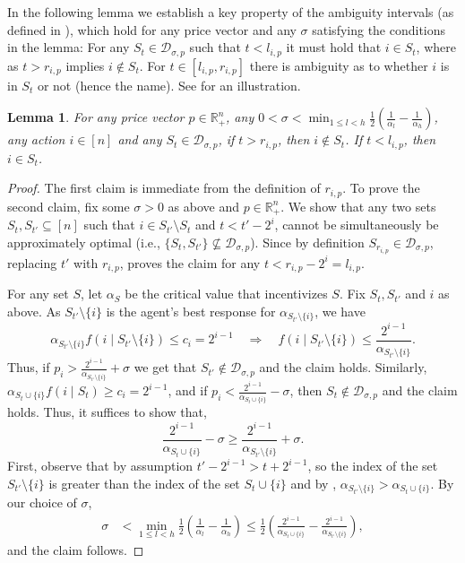 \documentclass[11pt]{article}
\newtheorem{lemma}{Lemma}
\newcommand{\reals}{\mathbb{R}}
\newcommand{\demand}[2]{\mathcal{D}_{{#1},{#2}}}
\newcommand{\demSigP}{\demand{\sigma}{p}}
\begin{document}
In the following lemma we establish a key property of the ambiguity intervals (as defined in ), which hold for any price vector and any $\sigma$ satisfying the conditions in the lemma: For any $S_t \in \demSigP$ such that $t < l_{i,p}$ it must hold that $i \in S_t$, where as $t > r_{i,p}$ implies $i \notin S_t$. For $t \in [l_{i,p}, r_{i,p}]$ there is ambiguity as to whether $i$ is in $S_t$ or not (hence the name). See  for an illustration.
 
\begin{lemma}\label{lem:RLintervals}
    For any price vector $p \in \reals_{+}^n$, any $0 < \sigma < \min_{1 \le l < h}\frac{1}{2}\left(\frac{1}{\alpha_l} - \frac{1}{\alpha_h}\right)$, any action $i \in [n]$ and any $S_t \in \demSigP$, if $t > r_{i,p}$, then $i \notin S_t$. If $t < l_{i,p}$, then $i \in S_t$.
\end{lemma}
\begin{proof}
    The first claim is immediate from the definition of $r_{i,p}$.
    To prove the second claim, fix some $\sigma > 0$ as above and $p \in \reals_{+}^n$. We show that any two sets $S_t,S_{t'} \subseteq [n]$ such that $i \in S_{t'}\setminus S_t$ and $t < t' - 2^i$, cannot be simultaneously be approximately optimal (i.e., $\{S_t,S_{t'}\} \not\subseteq \demSigP$).
    Since by definition $S_{r_{i,p}} \in \demSigP$, replacing $t'$ with $r_{i,p}$, proves the claim for any $t < r_{i,p} - 2^i = l_{i,p}$.

    For any set $S$, let $\alpha_S$ be the critical value that incentivizes $S$.
    Fix $S_t, S_{t'}$ and $i$ as above. 
    As $S_{t'} \setminus \{i\}$ is the agent's best response for $\alpha_{S_{t'}\setminus \{i\}}$, we have
    $$
    \alpha_{S_{t'}\setminus\{i\}}f(i \mid S_{t'}\setminus\{i\}) \le c_i = 2^{i-1}
    \quad
    \Longrightarrow
    \quad
    f(i \mid S_{t'}\setminus\{i\}) \le \frac{2^{i-1}}{\alpha_{S_{t'}\setminus\{i\}}}.
    $$
    Thus, if $p_i > \frac{2^{i-1}}{\alpha_{S_{t'}\setminus\{i\}}}  + \sigma$ we get that $S_{t'} \notin \demSigP$ and the claim holds.
    Similarly, $\alpha_{S_t \cup \{i\}} f(i \mid S_t) \ge c_i = 2^{i-1}$, and if $p_i < \frac{2^{i-1}}{\alpha_{S_t \cup \{i\}}} - \sigma$, then $S_t \notin \demSigP$ and the claim holds.
    Thus, it suffices to show that,
    $$
    \frac{2^{i-1}}{\alpha_{S_t \cup \{i\}}} - \sigma \geq \frac{2^{i-1}}{\alpha_{S_{t'}\setminus\{i\}}}  + \sigma.
    $$
    First, observe that by assumption $t' - 2^{i-1} > t + 2^{i-1}$, so the index of the set $S_{t'} \setminus \{i\}$ is greater than the index of the set $S_t \cup \{i\}$ and by , $\alpha_{S_{t'}\setminus \{i\}} > \alpha_{S_t\cup \{i\}}$. 
    By our choice of $\sigma$,
    \begin{align*}
        \sigma 
        &<
        \min_{1 \le l < h}
        \frac{1}{2}\left(\frac{1}{\alpha_l} - \frac{1}{\alpha_h}\right) 
        \le 
        \frac{1}{2}\left(\frac{2^{i-1}}{\alpha_{S_t \cup \{i\}}} - \frac{2^{i-1}}{\alpha_{S_{t'}\setminus\{i\}}}\right),
    \end{align*}
    and the claim follows.
\end{proof}
\end{document}
